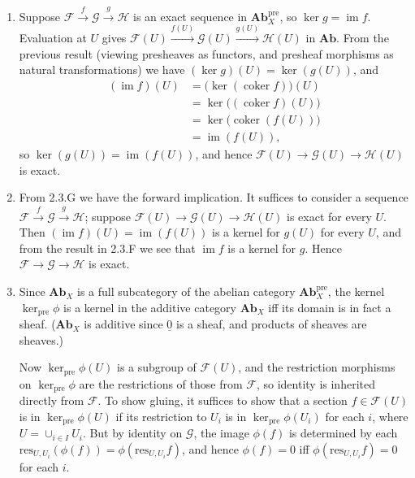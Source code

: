 \documentclass{report}
\newcommand{\cat}[1]{\mathbf{#1}} %
\newcommand{\shConst}[1]{\underline{#1}} %
\newcommand{\pre}{{\mathrm{pre}}} %
\newcommand{\res}{{\mathrm{res}}} %
\newcommand{\scrF}{\mathscr{F}}
\newcommand{\scrG}{\mathscr{G}}
\newcommand{\scrH}{\mathscr{H}}
\DeclareMathOperator{\im}{im}
\DeclareMathOperator{\coker}{coker}
\begin{document}
\begin{enumerate}[label=\textbf{2.3.\Alph*.}]
	\item Suppose $\scrF\xrightarrow{f}\scrG\xrightarrow{g}\scrH$ is an exact sequence
	      in $\cat{Ab}^\pre_X$, so $\ker g=\im f$. Evaluation at $U$ gives
	      $\scrF(U)\xrightarrow{f(U)}\scrG(U)\xrightarrow{g(U)}\scrH(U)$ in $\cat{Ab}$.
	      From the previous result (viewing presheaves as functors, and presheaf
	      morphisms as natural transformations) we have $(\ker g)(U)=\ker(g(U))$,
	      and
	      \begin{align*}
		      (\im f)(U) & = \bigl(\ker(\coker f)\bigr)(U) \\
		                 & = \ker\bigl((\coker f)(U)\bigr) \\
		                 & = \ker\bigl(\coker(f(U))\bigr)  \\
		                 & = \im(f(U)),
	      \end{align*}
	      so $\ker(g(U))=\im(f(U))$, and hence $\scrF(U)\to\scrG(U)\to\scrH(U)$ is exact.

	\item From 2.3.G we have the forward implication. It suffices to consider
	      a sequence $\scrF\xrightarrow{f}\scrG\xrightarrow{g}\scrH$; suppose
	      $\scrF(U)\to\scrG(U)\to\scrH(U)$ is exact for every $U$. Then
	      $(\im f)(U)=\im(f(U))$ is a kernel for $g(U)$ for every $U$, and from
	      the result in 2.3.F we see that $\im f$ is a kernel for $g$. Hence
	      $\scrF\to\scrG\to\scrH$ is exact.

	\item Since $\cat{Ab}_X$ is a full subcategory of the abelian category
	      $\cat{Ab}^\pre_X$, the kernel $\ker_\pre\phi$ is a kernel in
	      the additive category $\cat{Ab}_X$ iff its domain is in fact a sheaf.
	      ($\cat{Ab}_X$ is additive since $\shConst0$ is a sheaf, and products
	      of sheaves are sheaves.)

	      Now $\ker_\pre\phi(U)$ is a subgroup of $\scrF(U)$, and the restriction
	      morphisms on $\ker_\pre\phi$ are the restrictions of those from $\scrF$,
	      so identity is inherited directly from $\scrF$. To show gluing, it
	      suffices to show that a section $f\in\scrF(U)$ is in $\ker_\pre\phi(U)$
	      if its restriction to $U_i$ is in $\ker_\pre\phi(U_i)$ for each $i$,
	      where $U=\cup_{i\in I}U_i$. But by identity on $\scrG$, the image
	      $\phi(f)$ is determined by each
	      $\res_{U,U_i}(\phi(f))=\phi(\res_{U,U_i}f)$, and hence $\phi(f)=0$
	      iff $\phi(\res_{U,U_i}f)=0$ for each $i$.


\end{enumerate}
\end{document}
